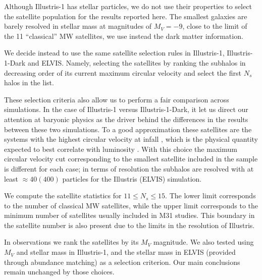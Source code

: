 \documentclass[a4paper,fleqn,usenatbib]{mnras}
\begin{document}
Although Illustris-1 has stellar particles, we do not use their
properties to select the satellite population for the results reported
here. 
The smallest galaxies are barely resolved in stellar mass at
magnitudes of $M_V=-9$, close to the limit of the 11 ``classical'' MW
satellites, we use instead the dark matter information. 

We decide instead to use the same satellite selection rules in
Illustris-1, Illustris-1-Dark and ELVIS.
Namely, selecting the satellites by ranking the subhalos in decreasing
order of its current maximum circular velocity and select the first
$N_s$ halos in the list. 

These selection criteria also  allow us to perform a fair comparison
across simulations. 
In the case of Illustris-1 versus Illustris-1-Dark, it let us direct
our attention at baryonic physics as the driver behind the differences
in the results between these two simulations.  
To a good approximation these satellites are the systems with the
highest circular velocity at infall \citep{2011MNRAS.415L..40B}, which
is the physical quantity expected to best correlate with luminosity
\citep{2004ApJ...609...35K,2006ApJ...647..201C,2010MNRAS.404.1111G}.  
With this choice the maximum circular velocity cut corresponding to the
smallest satellite included in the sample is different for each case;
in terms of resolution the subhalos are resolved with at least
$\approx 40 (400)$ particles for the Illustris (ELVIS) simulation.

We compute the satellite statistics for $11\leq N_s\leq 15$.
The lower limit corresponds to the number of classical MW satellites,
while the upper limit corresponds to the minimum number of
satellites usually included in M31 studies.
This boundary in the satellite number is also present due to the
limits in the resolution of Illustris.


In observations we rank the satellites by its $M_V$
magnitude.  
We also tested using $M_V$ and stellar mass in Illustris-1, and the
stellar mass in ELVIS (provided through abundance matching) as a
selection criterion. 
Our main conclusions remain unchanged by those choices. 
\end{document}
